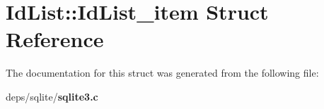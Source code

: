 \section{Id\-List::Id\-List\_\-item Struct Reference}
\label{structIdList_1_1IdList__item}


The documentation for this struct was generated from the following file:\begin{CompactItemize}
\item 
deps/sqlite/\bf{sqlite3.c}\end{CompactItemize}
